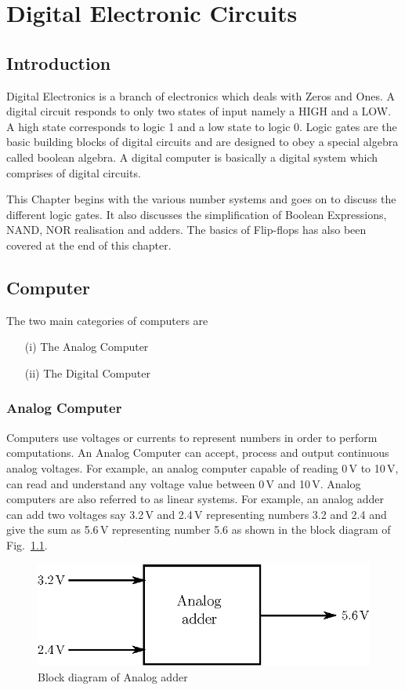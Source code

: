 \chapter{Digital Electronic Circuits}\label{chap6}

\section*{Introduction}

Digital Electronics is a branch of electronics which deals with Zeros and Ones. A digital circuit responds to only two states of input namely a HIGH and a LOW. A high state corresponds to logic 1 and a low state to logic 0. Logic gates are the basic building blocks of digital circuits and are designed to obey a special algebra called boolean algebra. A digital computer is basically a digital system which comprises of digital circuits.

This Chapter begins with the various number systems and goes on to discuss the different logic gates. It also discusses the simplification of Boolean Expressions, NAND, NOR realisation and adders. The basics of Flip-flops has also been covered at the end of this chapter.

\section{Computer}\label{sec6.1}

The two main categories of computers are
\begin{itemize}
\item[(i)] The Analog Computer

\item[(ii)] The Digital Computer
\end{itemize}

\subsection{Analog Computer}\label{sec6.1.1}

Computers use voltages or currents to represent numbers in order to perform computations. An Analog Computer can accept, process and output continuous analog voltages. For example, an analog computer capable of reading 0\,V to 10\,V, can read and understand any voltage value between 0\,V and 10\,V. Analog computers are also referred to as linear systems. For example, an analog adder can add two voltages say 3.2\,V and 2.4\,V representing numbers 3.2 and 2.4 and give the sum as 5.6\,V representing number 5.6 as shown in the block diagram of Fig.~\ref{fig6.1}. 
\begin{figure}[H]
\centering
\includegraphics{chap6/addfig1.eps}
\caption{Block diagram of Analog adder}\label{fig6.1}
\end{figure}

